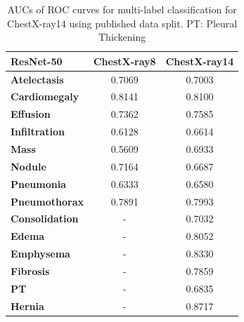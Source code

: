 \documentclass[10pt,twocolumn,letterpaper]{article}
\begin{document}
\begin{table}[th]
	\centering
	\begin{tabular}{|p{6.5em}||c|c|}
		\hline
		{\bf ResNet-50}   & ChestX-ray8 & ChestX-ray14 \\
		\hline\hline
		{\bf Atelectasis} & 0.7069& 0.7003 \\
		{\bf Cardiomegaly} & 0.8141& 0.8100 \\
		{\bf Effusion} & 0.7362& 0.7585 \\
		{\bf Infiltration} & 0.6128& 0.6614 \\
		{\bf Mass} & 0.5609& 0.6933 \\
		{\bf Nodule} & 0.7164& 0.6687\\
		{\bf Pneumonia} & 0.6333& 0.6580\\
		{\bf Pneumothorax} & 0.7891 &0.7993\\
		{\bf Consolidation} & - & 0.7032\\
		{\bf Edema} & - & 0.8052\\
		{\bf Emphysema} & - & 0.8330\\
		{\bf Fibrosis} & - & 0.7859\\
		{\bf PT} & - & 0.6835\\
		{\bf Hernia} & - & 0.8717\\
		\hline
	\end{tabular}
	\label{tab:AUC14}
	\caption{AUCs of ROC curves for multi-label classification for ChestX-ray14 using published data split. PT: Pleural Thickening}
\end{table}
\end{document}
